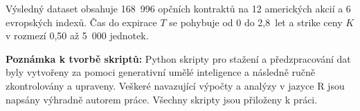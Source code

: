 Výsledný dataset obsahuje 168~996 opčních kontraktů na 12 amerických akcií a 6 evropských indexů. Čas do expirace \(T\) se pohybuje od 0 do 2{,}8~let a strike ceny \(K\) v rozmezí 0{,}50 až 5~000 jednotek.

\bigskip
\noindent\textbf{Poznámka k tvorbě skriptů:} Python skripty pro stažení a předzpracování dat byly vytvořeny za pomoci generativní umělé inteligence a následně ručně zkontrolovány a upraveny. Veškeré navazující výpočty a analýzy v jazyce R jsou napsány výhradně autorem práce. Všechny skripty jsou přiloženy k práci.
